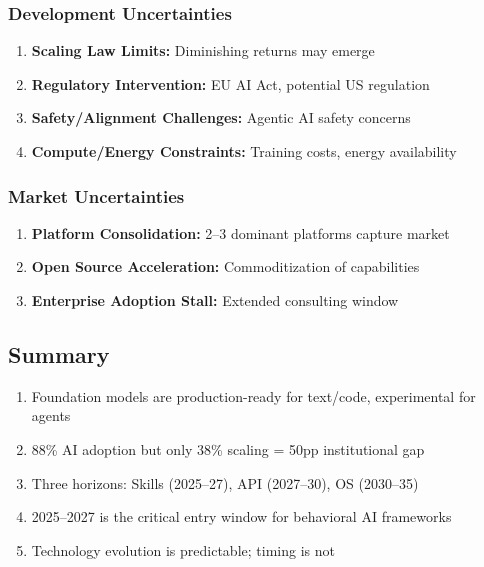 \subsubsection{Development Uncertainties}

\begin{enumerate}
    \item \textbf{Scaling Law Limits:} Diminishing returns may emerge
    \item \textbf{Regulatory Intervention:} EU AI Act, potential US regulation
    \item \textbf{Safety/Alignment Challenges:} Agentic AI safety concerns
    \item \textbf{Compute/Energy Constraints:} Training costs, energy availability
\end{enumerate}

\subsubsection{Market Uncertainties}

\begin{enumerate}
    \item \textbf{Platform Consolidation:} 2--3 dominant platforms capture market
    \item \textbf{Open Source Acceleration:} Commoditization of capabilities
    \item \textbf{Enterprise Adoption Stall:} Extended consulting window
\end{enumerate}


\subsection{Summary}

\begin{tcolorbox}[colback=gray!5!white, colframe=gray!75!black,
    title=\textbf{Summary: Appendix VVV.0 Key Points}]

\begin{enumerate}
    \item Foundation models are production-ready for text/code, experimental for agents
    \item 88\% AI adoption but only 38\% scaling = 50pp institutional gap
    \item Three horizons: Skills (2025--27), API (2027--30), OS (2030--35)
    \item 2025--2027 is the critical entry window for behavioral AI frameworks
    \item Technology evolution is predictable; timing is not
\end{enumerate}

\end{tcolorbox}

